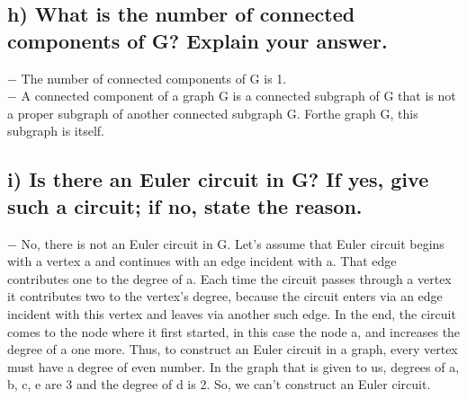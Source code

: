 \documentclass[12pt]{article}
\begin{document}
\begin{figure}[H]
	\centering
	
\end{figure}

\subsection*{h) What is the number of connected components of G? Explain your answer.}

	$-$ The number of connected components of G is 1.\\
	$-$ A connected component of a graph G is a connected subgraph of G that is not a proper subgraph of another connected subgraph G. Forthe graph G, this subgraph is itself.\\ 

\subsection*{i) Is there an Euler circuit in G? If yes, give such a circuit; if no, state the reason.}

	$-$ No, there is not an Euler circuit in G. Let's assume that Euler circuit begins with a vertex a and continues with an edge incident with a. That edge contributes one to the degree of a. Each time the circuit passes through a vertex it contributes two to the vertex’s degree, because the circuit enters via an edge incident with this vertex and leaves via another such edge. In the end, the circuit comes to the node where it first started, in this case the node a, and increases the degree of a one more. Thus, to construct an  Euler circuit in a graph, every vertex must have a degree of even number. In the graph that is given to us, degrees of a, b, c, e are 3 and the degree of d is 2. So, we can't construct an Euler circuit.\\
\end{document}
